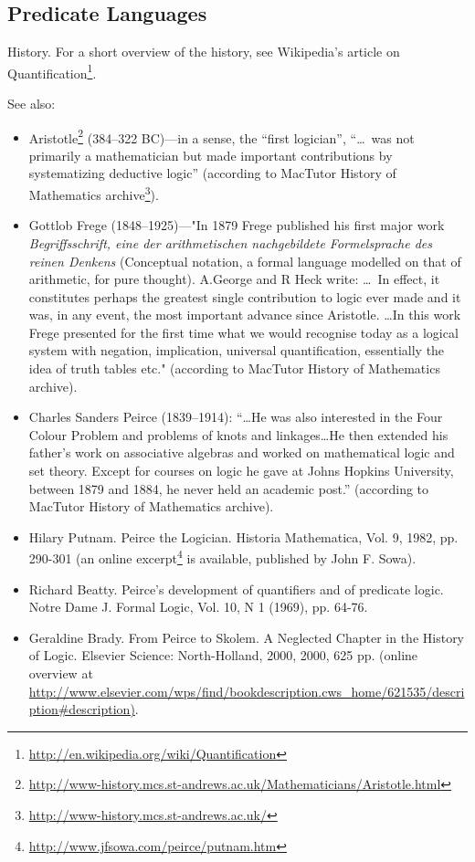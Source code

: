 \subsection{Predicate Languages}

History.
For a short overview of the history, see Wikipedia's article on Quantification\footnote{\url{http://en.wikipedia.org/wiki/Quantification}}.

See also:

\begin{itemize}
    \item Aristotle\footnote{\url{http://www-history.mcs.st-andrews.ac.uk/Mathematicians/Aristotle.html}} (384--322 BC)---in a sense, the ``first logician'', ``\ldots~was not primarily a mathematician but made important contributions by systematizing deductive logic'' (according to MacTutor History of Mathematics archive\footnote{\url{http://www-history.mcs.st-andrews.ac.uk/}}).
    \item Gottlob Frege (1848--1925)---"In 1879 Frege published his first major work \emph{Begriffsschrift, eine der arithmetischen nachgebildete Formelsprache des reinen Denkens} (Conceptual notation, a formal language modelled on that of arithmetic, for pure thought).
    A.George and R Heck write: \ldots~In effect, it constitutes perhaps the greatest single contribution to logic ever made and it was, in any event, the most important advance since Aristotle.
    \ldots  In this work Frege presented for the first time what we would recognise today as a logical system with negation, implication, universal quantification, essentially the idea of truth tables etc." (according to MacTutor History of Mathematics archive).
\item Charles Sanders Peirce (1839--1914): ``\ldots  He was also interested in the Four Colour Problem and problems of knots and linkages\ldots  He then extended his father's work on associative algebras and worked on mathematical logic and set theory. Except for courses on logic he gave at Johns Hopkins University, between 1879 and 1884, he never held an academic post.'' (according to MacTutor History of Mathematics archive).
\item Hilary Putnam. Peirce the Logician. Historia Mathematica, Vol. 9, 1982, pp. 290-301 (an online excerpt\footnote{\url{http://www.jfsowa.com/peirce/putnam.htm}} is available, published by John F. Sowa).
\item Richard Beatty. Peirce's development of quantifiers and of predicate logic. Notre Dame J. Formal Logic, Vol. 10, N 1 (1969), pp. 64-76.
\item Geraldine Brady. From Peirce to Skolem. A Neglected Chapter in the History of Logic. Elsevier Science: North-Holland, 2000, 2000, 625 pp. (online overview at \url{http://www.elsevier.com/wps/find/bookdescription.cws\_home/621535/description#description)}.
\end{itemize}

